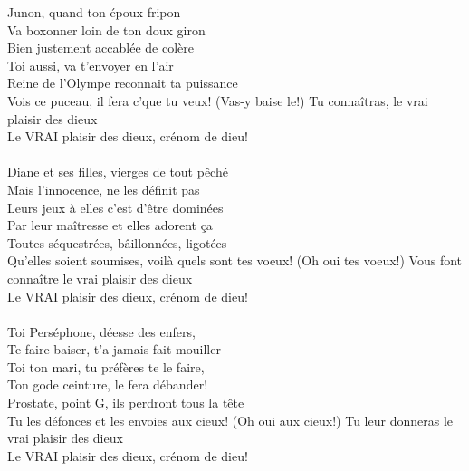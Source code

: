 %
 Junon, quand ton époux fripon
\\Va boxonner loin de ton doux giron
\\Bien justement accablée de colère
\\Toi aussi, va t'envoyer en l'air
\\Reine de l'Olympe reconnait ta puissance
\\Vois ce puceau, il fera c'que tu veux! (Vas-y baise le!)
{Tu connaîtras, le vrai plaisir des dieux  ~~~~~~~~~~}
\\Le VRAI plaisir des dieux, crénom de dieu!
\\\\Diane et ses filles, vierges de tout pêché
\\Mais l'innocence, ne les définit pas
\\Leurs jeux à elles c'est d'être dominées
\\Par leur maîtresse et elles adorent ça
\\Toutes séquestrées, bâillonnées, ligotées
\\Qu'elles soient soumises, voilà quels sont tes voeux! (Oh oui tes voeux!)
{Vous font connaître le vrai plaisir des dieux  ~~~~}
\\Le VRAI plaisir des dieux, crénom de dieu!
\\\\Toi Perséphone, déesse des enfers,
\\Te faire baiser, t'a jamais fait mouiller
\\Toi ton mari, tu préfères te le faire,
\\Ton gode ceinture, le fera débander!
\\Prostate, point G, ils perdront tous la tête
\\Tu les défonces et les envoies aux cieux! (Oh oui aux cieux!)
{Tu leur donneras le vrai plaisir des dieux  ~~~~~~~}
\\Le VRAI plaisir des dieux, crénom de dieu!
